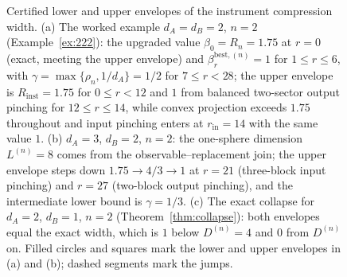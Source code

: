 \documentclass[11pt,a4paper]{article}
\begin{document}
\begin{figure}[t]
\medskip
{}
{\small\caption{Certified lower and upper envelopes of the instrument compression width. (a) The worked example $d_A=d_B=2$, $n=2$ (Example~\ref{ex:222}): the upgraded value $\beta_0=R_n=1.75$ at $r=0$ (exact, meeting the upper envelope) and $\beta_r^{\mathrm{best},(n)}=1$ for $1\le r\le6$, with $\gamma=\max\{\rho_n,1/d_A\}=1/2$ for $7\le r<28$; the upper envelope is $R_{\mathrm{inst}}=1.75$ for $0\le r<12$ and $1$ from balanced two-sector output pinching for $12\le r\le14$, while convex projection exceeds $1.75$ throughout and input pinching enters at $r_{\mathrm{in}}=14$ with the same value $1$. (b) $d_A=3$, $d_B=2$, $n=2$: the one-sphere dimension $L^{(n)}=8$ comes from the observable--replacement join; the upper envelope steps down $1.75\to4/3\to1$ at $r=21$ (three-block input pinching) and $r=27$ (two-block output pinching), and the intermediate lower bound is $\gamma=1/3$. (c) The exact collapse for $d_A=2$, $d_B=1$, $n=2$ (Theorem~\ref{thm:collapse}): both envelopes equal the exact width, which is $1$ below $D^{(n)}=4$ and $0$ from $D^{(n)}$ on. Filled circles and squares mark the lower and upper envelopes in (a) and (b); dashed segments mark the jumps.}
}
\label{fig:envelope}
\end{figure}
\end{document}
